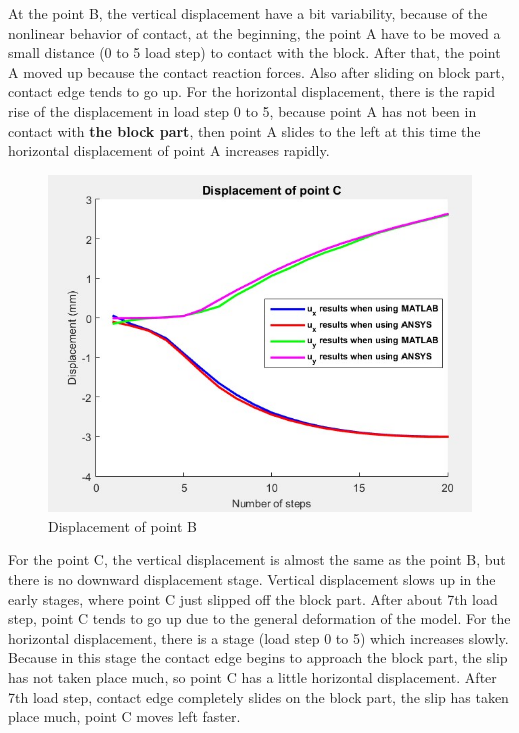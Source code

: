 At the point B, the vertical displacement have a bit variability, because of the nonlinear
behavior of contact, at the beginning, the point A have to be moved a small distance (0 to
5 load step) to contact with the block.  After that, the point A moved up because the
contact reaction forces. Also after sliding on block part, contact edge tends to go up.
For the horizontal displacement, there is the rapid rise of the
displacement in load step 0 to 5, because point A has not been in contact with {\bf the block part}, then point A slides to the left at this time the horizontal displacement of point A increases rapidly.
\newline
\begin{figure}[H]
    \centering
    \includegraphics[scale=0.83]{Figures/dc.jpg}
    \decoRule
    \caption{Displacement of point B}
    \label{fig:dc}
\end{figure} \noindent
For the point C, the vertical displacement is almost the same as the point B, but there is no downward displacement stage. Vertical displacement slows up in the early stages, where point C just slipped off the block part. 
After about 7th load step, point C tends to go up due to the general deformation of the model.
For the horizontal displacement, there is a stage (load step 0 to 5) which increases slowly. Because in this stage the contact edge begins to approach the block part, the slip has not taken place much, so point C has a little horizontal displacement.
After 7th load step, contact edge completely slides on the block part, the slip has taken place much, point C moves left faster.
\newpage
